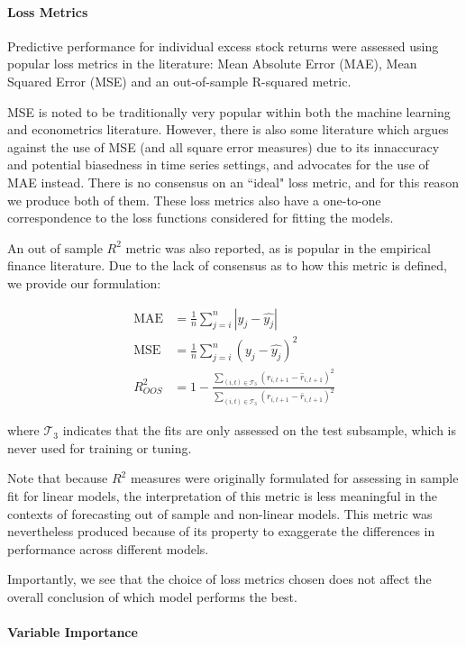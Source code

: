 \documentclass[11pt, a4paper, table]{article}
\begin{document}
\paragraph{Loss Metrics}

Predictive performance for individual excess stock returns were assessed using popular loss metrics in the literature: Mean Absolute Error (MAE), Mean Squared Error (MSE) and an out-of-sample R-squared metric.

MSE is noted to be traditionally very popular within both the machine learning and econometrics literature. However, there is also some literature which argues against the use of MSE (and all square error measures) due to its innaccuracy and potential biasedness in time series settings, and advocates for the use of MAE instead. There is no consensus on an ``ideal" loss metric, and for this reason we produce both of them. These loss metrics also have a one-to-one correspondence to the loss functions considered for fitting the models.

An out of sample $R^2$ metric was also reported, as is popular in the empirical finance literature. Due to the lack of consensus as to how this metric is defined, we provide our formulation: 

\begin{align}
\text{MAE} &= \frac{1}{n} \sum_{j = i}^{n} |y_j - \hat{y_j}| \\
\text{MSE} &= \frac{1}{n} \sum_{j = i}^{n} \left( y_j - \hat{y_j}\right) ^2 \\
R^2_{OOS} &= 1 - \frac{\sum_{(i, t)\in\mathcal{T}_3}(r_{i, t+1} - \widehat{r}_{i, t+1})^2}
{\sum_{(i, t)\in\mathcal{T}_3} \left( r_{i, t+1} - \bar{r}_{i, t+1} \right) ^2}
\end{align}

where $\mathcal{T}_3$ indicates that the fits are only assessed on the test subsample, which is never used for training or tuning.

Note that because $R^2$ measures were originally formulated for assessing in sample fit for linear models, the interpretation of this metric is less meaningful in the contexts of forecasting out of sample and non-linear models. This metric was nevertheless produced because of its property to exaggerate the differences in performance across different models.

Importantly, we see that the choice of loss metrics chosen does not affect the overall conclusion of which model performs the best.

\paragraph{Variable Importance}
\end{document}
